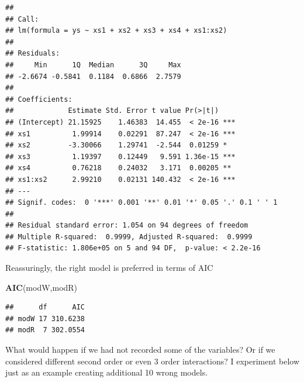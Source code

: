\documentclass[
]{book}
\newenvironment{Shaded}{\begin{snugshade}}{\end{snugshade}}
\newcommand{\KeywordTok}[1]{\textcolor[rgb]{0.13,0.29,0.53}{\textbf{#1}}}
\newcommand{\NormalTok}[1]{#1}
\begin{document}
\begin{verbatim}
## 
## Call:
## lm(formula = ys ~ xs1 + xs2 + xs3 + xs4 + xs1:xs2)
## 
## Residuals:
##     Min      1Q  Median      3Q     Max 
## -2.6674 -0.5841  0.1184  0.6866  2.7579 
## 
## Coefficients:
##             Estimate Std. Error t value Pr(>|t|)    
## (Intercept) 21.15925    1.46383  14.455  < 2e-16 ***
## xs1          1.99914    0.02291  87.247  < 2e-16 ***
## xs2         -3.30066    1.29741  -2.544  0.01259 *  
## xs3          1.19397    0.12449   9.591 1.36e-15 ***
## xs4          0.76218    0.24032   3.171  0.00205 ** 
## xs1:xs2      2.99210    0.02131 140.432  < 2e-16 ***
## ---
## Signif. codes:  0 '***' 0.001 '**' 0.01 '*' 0.05 '.' 0.1 ' ' 1
## 
## Residual standard error: 1.054 on 94 degrees of freedom
## Multiple R-squared:  0.9999,	Adjusted R-squared:  0.9999 
## F-statistic: 1.806e+05 on 5 and 94 DF,  p-value: < 2.2e-16
\end{verbatim}

Reassuringly, the right model is preferred in terms of AIC

\begin{Shaded}
\begin{Highlighting}[]
\KeywordTok{AIC}\NormalTok{(modW,modR)}
\end{Highlighting}
\end{Shaded}

\begin{verbatim}
##      df      AIC
## modW 17 310.6238
## modR  7 302.0554
\end{verbatim}

What would happen if we had not recorded some of the variables? Or if we considered different second order or even 3 order interactions? I experiment below just as an example creating additional 10 wrong models.
\end{document}
